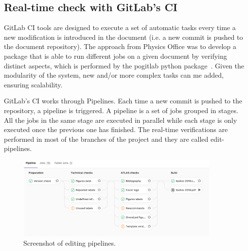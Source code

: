 \subsection{Real-time check with GitLab’s CI}
\label{sec:Real-time_check_with GitLabs_CI}

GitLab CI tools are designed to execute a set of automatic tasks every time a new modification is introduced in the document (i.e. a new commit is pushed to the document repository). The approach from Physics Office was to develop a package that is able to run different jobs on a given document by verifying distinct aspects, which is performed by the pogitlab python package~\cite{pogitlab-repo}. Given the modularity of the system, new and/or more complex tasks can me added, ensuring scalability.    
                    
GitLab’s CI works through Pipelines. Each time a new commit is pushed to the repository, a pipeline is triggered. A pipeline is a set of jobs grouped in stages. All the jobs in the same stage are executed in parallel while each stage is only executed once the previous one has finished. The real-time verifications are performed in most of the branches of the project and they are called edit-pipelines.
\begin{figure}[ht!]
  \centering
  \includegraphics[width=0.9\textwidth]{figures/editing_pipelines_1.png}
  \caption{Screenshot of editing pipelines.}
  \label{fig:editing_pipelines_1}
\end{figure}

